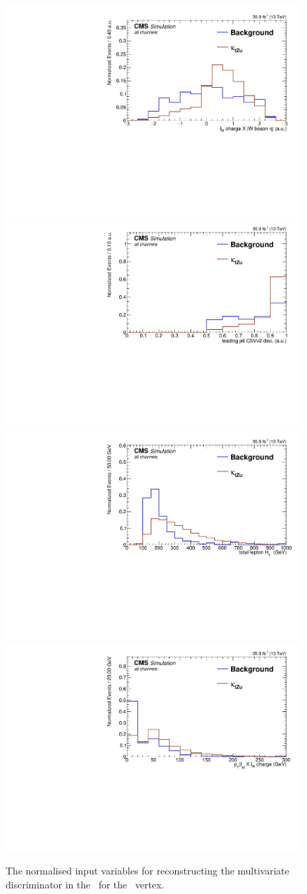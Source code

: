 \begin{figure}[htbp]
    \includegraphics[width=0.3\linewidth]{6_Search/Figures/BDTinputvars/Zut/singletop_MVA_charge_asym_all_Normalized}
    \includegraphics[width=0.3\linewidth]{6_Search/Figures/BDTinputvars/Zut/singletop_MVA_bdiscCSVv2_jet_0_all_Normalized}
    \includegraphics[width=0.3\linewidth]{6_Search/Figures/BDTinputvars/Zut/singletop_MVA_TotalHt_lep_all_Normalized}
    \includegraphics[width=0.3\linewidth]{6_Search/Figures/BDTinputvars/Zut/singletop_MVA_ptWQ_all_Normalized}
 	\caption{The normalised input variables for reconstructing the multivariate discriminator in the \STSR\ for the \Zut\ vertex.}
	\label{fig:singletopZutnormalized}
\end{figure}




\clearpage
